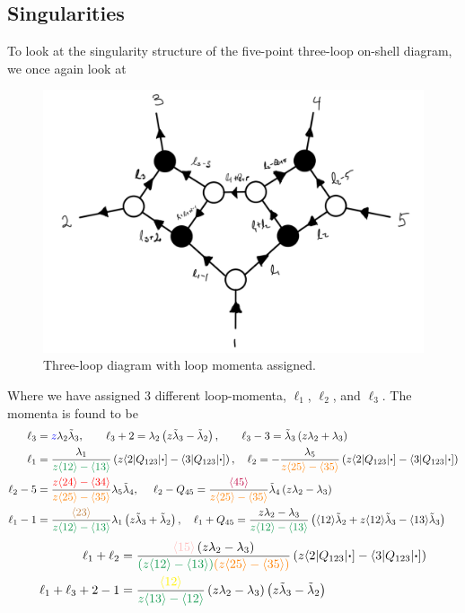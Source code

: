 \documentclass[letter,11pt]{article}
\newcommand{\pink}[1]{\textcolor{pink}{#1}}
\newcommand{\green}[1]{\textcolor{ForestGreen}{#1}}
\newcommand{\orange}[1]{\textcolor{orange}{#1}}
\newcommand{\brown}[1]{\textcolor{brown}{#1}}
\newcommand{\ab}[1]{\langle #1 \rangle}
\newcommand{\aMs}[3]{\langle #1|#2|#3]}  		%
\begin{document}
\subsection{Singularities}
To look at the singularity structure of the five-point three-loop on-shell diagram, we once again  look at 
\begin{figure}[H]
	\centering
	\includegraphics[width=0.5\linewidth]{5pt3l3}
	\caption{Three-loop diagram with loop momenta assigned.}
	\label{fig:5pt3l_2}
\end{figure}
\noindent Where we have assigned 3 different loop-momenta, $\ell_1$, $\ell_2$, and $\ell_3$. 
The momenta is found to be
\begin{equation}
	\begin{aligned}
\ell_3&=\textcolor{blue}{z} \lambda_2\tilde\lambda_3,~~~~~~
	\ell_3+2 = \lambda_2\left(z \tilde \lambda_3- \tilde \lambda_2\right)
,~~~~~~
	\ell_3-3 = \tilde \lambda_3\left(z  \lambda_2+ \lambda_3\right)\\
	\ell_1&=\frac{\lambda_1}{\green{z\ab{12}-\ab{13}}}\left(z\aMs{2}{Q_{123}}{\bm\cdot}-\aMs{3}{Q_{123}}{\bm\cdot}\right),~~~
	\ell_2=-\frac{\lambda_5}{\orange{z\ab{25}-\ab{35}}}\left(z\aMs{2}{Q_{123}}{\bm\cdot}-\aMs{3}{Q_{123}}{\bm\cdot}\right)
	\\
	\ell_2-5&=\frac{\textcolor{red}{z\ab{24}-\ab{34}}}{\orange{z\ab{25}-\ab{35}}}\lambda_5\tilde\lambda_4,~~~~\ell_2-Q_{45}=
	\frac{\textcolor{purple}{\ab{45}}}{\textcolor{orange}{z\ab{25}-\ab{35}}}\tilde\lambda_4\left(z\lambda_2-\lambda_3\right)\\
	\ell_1-1&=\frac{\brown{\ab{23}}}{\textcolor{ForestGreen}{z\ab{12}-\ab{13}}}\lambda_1\left(z\tilde \lambda_3+\tilde\lambda_2 \right),~~~
\ell_1+Q_{45}=\frac{z\lambda_2-\lambda_3}{\green{z\ab{12}-\ab{13}}}\left(\ab{12}\tilde \lambda_2+z\ab{12}\tilde \lambda_3-\ab{13}\tilde \lambda_3\right)	
	\end{aligned}
\end{equation}
\begin{equation}
	\begin{aligned}
		\ell_1+\ell_2&=
		\frac{\pink{\ab{15}}\left(z\lambda_2-\lambda_3\right)}{\green{\left(z\ab{12}-\ab{13}\right)}\orange{\left(z\ab{25}-\ab{35}\right)}}\left(z\aMs{2}{Q_{123}}{\bm\cdot}-\aMs{3}{Q_{123}}{\bm\cdot}\right)\\
		\ell_1+\ell_3+2-1&=\frac{\textcolor{yellow}{\ab{12}}}{\green{z\ab{13}-\ab{12}}}
		\left(z \lambda_2-\lambda_3\right)\left(z \tilde\lambda_3-\tilde \lambda_2\right)
	\end{aligned}
\end{equation}
\end{document}
